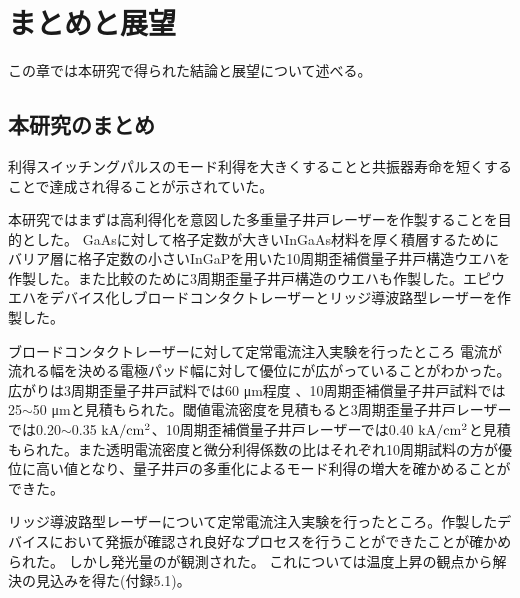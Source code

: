
\chapter{まとめと展望}
この章では本研究で得られた結論と展望について述べる。
\section{本研究のまとめ}%


利得スイッチングパルスのモード利得を大きくすることと共振器寿命を短くすることで達成され得ることが示されていた。


本研究ではまずは高利得化を意図した多重量子井戸レーザーを作製することを目的とした。
GaAsに対して格子定数が大きいInGaAs材料を厚く積層するためにバリア層に格子定数の小さいInGaPを用いた10周期歪補償量子井戸構造ウエハを作製した。また比較のために3周期歪量子井戸構造のウエハも作製した。エピウエハをデバイス化しブロードコンタクトレーザーとリッジ導波路型レーザーを作製した。


ブロードコンタクトレーザーに対して定常電流注入実験を行ったところ
電流が流れる幅を決める電極パッド幅に対して優位にが広がっていることがわかった。広がりは3周期歪量子井戸試料では60 \si{\micro\metre}程度
、10周期歪補償量子井戸試料では25$\sim$50 \si{\micro\metre}と見積もられた。閾値電流密度を見積もると3周期歪量子井戸レーザーでは0.20$\sim$0.35 $\rm{kA/cm^{2}}$、10周期歪補償量子井戸レーザーでは0.40 $\rm{kA/cm^2}$と見積もられた。また透明電流密度と微分利得係数の比はそれぞれ10周期試料の方が優位に高い値となり、量子井戸の多重化によるモード利得の増大を確かめることができた。

リッジ導波路型レーザーについて定常電流注入実験を行ったところ。作製したデバイスにおいて発振が確認され良好なプロセスを行うことができたことが確かめられた。%
しかし発光量のが観測された。%
これについては温度上昇の観点から解決の見込みを得た(付録5.1)。


